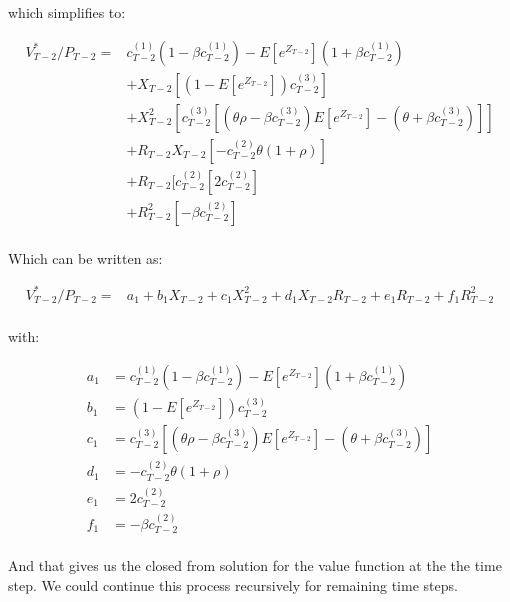 \documentclass{article}[12pt]
\begin{document}
which simplifies to:

\begin{align*}
V^*_{T-2}/P_{T-2} =  &c_{T-2}^{(1)}(1-\beta c_{T-2}^{(1)}) - E[e^{Z_{T-2}}](1+\beta c_{T-2}^{(1)}) \\
& + X_{T-2}[ (1-E[e^{Z_{T-2}}])c_{T-2}^{(3)}]\\
& + X_{T-2}^2[c_{T-2}^{(3)}[(\theta \rho -\beta c_{T-2}^{(3)})E[e^{Z_{T-2}}] - (\theta + \beta c_{T-2}^{(3)} )]]\\
& + R_{T-2}X_{T-2}[-c_{T-2}^{(2)} \theta (1+ \rho)]\\
& + R_{T-2}[c_{T-2}^{(2)}[2 c_{T-2}^{(2)}]\\
& + R_{T-2}^2[-\beta  c_{T-2}^{(2)}]\\
\end{align*}

Which can be written as:

\begin{align*}
V^*_{T-2}/P_{T-2} =  &a_1 + b_1 X_{T-2} + c_1 X_{T-2}^2 + d_1 X_{T-2}R_{T-2} + e_1 R_{T-2} + f_1 R_{T-2}^2\\
\end{align*}

with:

\begin{align*}
a_1 &= c_{T-2}^{(1)}(1-\beta c_{T-2}^{(1)}) - E[e^{Z_{T-2}}](1+\beta c_{T-2}^{(1)}) \\
b_1 &= (1-E[e^{Z_{T-2}}])c_{T-2}^{(3)}\\
c_1 &= c_{T-2}^{(3)}[(\theta \rho -\beta c_{T-2}^{(3)})E[e^{Z_{T-2}}] - (\theta + \beta c_{T-2}^{(3)} )]\\
d_1 &= - c_{T-2}^{(2)} \theta (1+ \rho)\\
e_1 &= 2 c_{T-2}^{(2)}\\
f_1 &= -\beta  c_{T-2}^{(2)}\\
\end{align*}

And that gives us the closed from solution for the value function at the the time step. We could continue this process recursively for remaining time steps.
\end{document}
